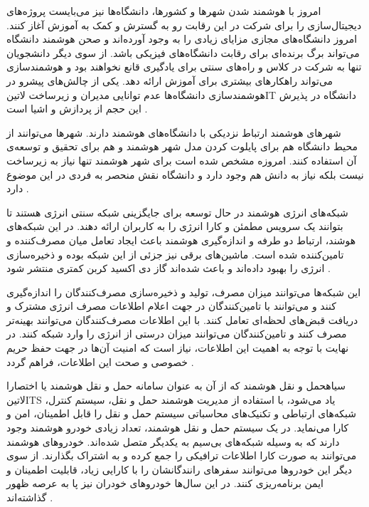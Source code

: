 
امروز با هوشمند شدن شهرها و کشورها، دانشگاه‌ها نیز می‌بایست پروژه‌های دیجیتال‌سازی را برای شرکت در این رقابت رو به گسترش و کمک به آموزش آغاز کنند.
امروز دانشگاه‌های مجازی مزایای زیادی را به وجود آورده‌اند و صحن هوشمند دانشگاه می‌تواند برگ برنده‌ای برای رقابت دانشگاه‌های فیزیکی باشد. از سوی دیگر دانشجویان تنها به شرکت در کلاس و راه‌های سنتی
برای یادگیری قانع نخواهند بود و هوشمندسازی می‌تواند راهکارهای بیشتری برای آموزش ارائه دهد.
یکی از چالش‌های پیشرو در هوشمندسازی دانشگاه‌ها عدم توانایی مدیران و زیرساخت ‌لاتین{IT} دانشگاه در پذیرش این حجم از پردازش و اشیا است
.

شهرهای هوشمند ارتباط نزدیکی با دانشگاه‌های هوشمند دارند. شهرها می‌توانند از محیط دانشگاه هم برای پایلوت کردن مدل شهر هوشمند و هم برای تحقیق و توسعه‌ی آن استفاده کنند.
امروزه مشخص شده است برای شهر هوشمند تنها نیاز به زیرساخت نیست بلکه نیاز به دانش هم وجود دارد و دانشگاه نقش منحصر به فردی در این موضوع دارد
.


شبکه‌های انرژی هوشمند در حال توسعه برای جایگزینی شبکه سنتی انرژی هستند تا بتوانند یک سرویس مطمئن و کارا انرژی را به کاربران ارائه دهند.
در این شبکه‌های هوشند، ارتباط دو طرفه و اندازه‌گیری هوشمند باعث ایجاد تعامل میان مصرف‌کننده و تامین‌کننده شده است. ماشین‌های برقی
نیز جزئی از این شبکه بوده و ذخیره‌سازی انرژی را بهبود داده‌اند
و باعث شده‌اند گاز دی اکسید کربن کمتری منتشر شود
.

این شبکه‌ها می‌توانند میزان مصرف، تولید و ذخیره‌سازی مصرف‌کنندگان را اندازه‌گیری کنند و می‌توانند با تامین‌کنندگان در جهت اعلام اطلاعات مصرف انرژی مشترک و دریافت قبض‌های لحظه‌ای تعامل کنند.
با این اطلاعات مصرف‌کنندگان می‌توانند بهینه‌تر مصرف کنند و تامین‌کنندگان می‌توانند میزان درستی از انرژی را وارد شبکه کنند.
در نهایت با توجه به اهمیت این اطلاعات، نیاز است که امنیت آن‌ها در جهت حفظ حریم خصوصی و صحت این اطلاعات، فراهم گردد
.


‌سیاه{حمل و نقل هوشمند} که از آن به عنوان سامانه حمل و نقل هوشمند یا اختصارا ‌لاتین{ITS} یاد می‌شود، با استفاده از مدیریت هوشمند حمل و نقل، سیستم کنترل، شبکه‌های ارتباطی و تکنیک‌های محاسباتی
سیستم حمل و نقل را قابل اطمینان، امن و کارا می‌نماید.
در یک سیستم حمل و نقل هوشمند، تعداد زیادی خودرو هوشمند وجود دارند که به وسیله شبکه‌های بی‌سیم به یکدیگر متصل شده‌اند. خودروهای هوشمند می‌توانند به صورت کارا اطلاعات ترافیکی را جمع کرده
و به اشتراک بگذارند. از سوی دیگر این خودروها می‌توانند سفر‌های رانندگانشان را با کارایی زیاد، قابلیت اطمینان و ایمن برنامه‌ریزی کنند. در این سال‌ها خودروهای خودران نیز پا به عرصه ظهور گذاشته‌اند
.

